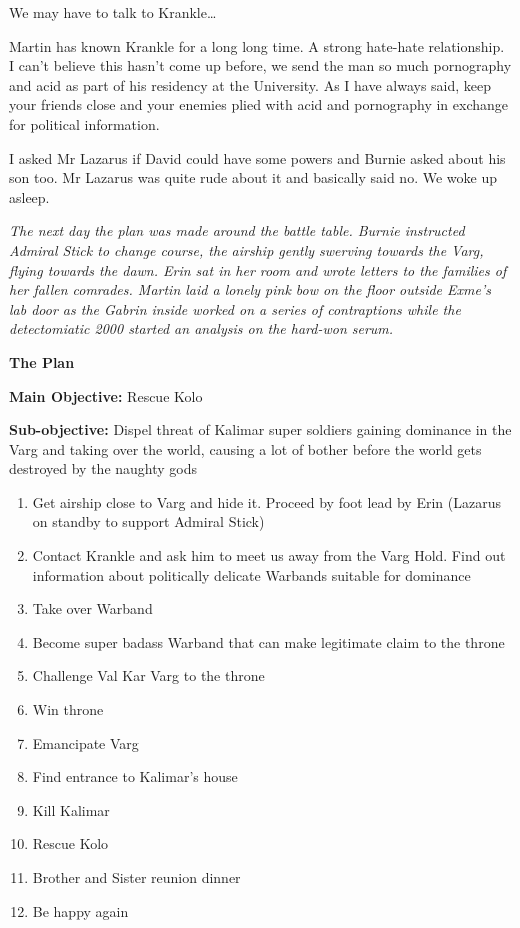 We may have to talk to Krankle…\medskip

Martin has known Krankle for a long long time. A strong hate-hate relationship. I can’t believe this hasn’t come up before, we send the man so much pornography and acid as part of his residency at the University. As I have always said, keep your friends close and your enemies plied with acid and pornography in exchange for political information.\medskip

I asked Mr Lazarus if David could have some powers and Burnie asked about his son too. Mr Lazarus was quite rude about it and basically said no. We woke up asleep.\medskip

\textit{The next day the plan was made around the battle table. Burnie instructed Admiral Stick to change course, the airship gently swerving towards the Varg, flying towards the dawn. Erin sat in her room and wrote letters to the families of her fallen comrades. Martin laid a lonely pink bow on the floor outside Exme’s lab door as the Gabrin inside worked on a series of contraptions while the detectomiatic 2000 started an analysis on the hard-won serum.}\medskip

\textbf{The Plan}\medskip

\textbf{Main Objective:} Rescue Kolo\medskip

\textbf{Sub-objective:} Dispel threat of Kalimar super soldiers gaining dominance in the Varg and taking over the world, causing a lot of bother before the world gets destroyed by the naughty gods\medskip

\begin{enumerate}
  \item Get airship close to Varg and hide it. Proceed by foot lead by Erin (Lazarus on standby to support Admiral Stick)
  \item Contact Krankle and ask him to meet us away from the Varg Hold. Find out information about politically delicate Warbands suitable for dominance
  \item Take over Warband
  \item Become super badass Warband that can make legitimate claim to the throne
  \item Challenge Val Kar Varg to the throne
  \item Win throne
  \item Emancipate Varg
  \item Find entrance to Kalimar’s house
  \item Kill Kalimar
  \item Rescue Kolo
  \item Brother and Sister reunion dinner
  \item Be happy again
\end{enumerate}

